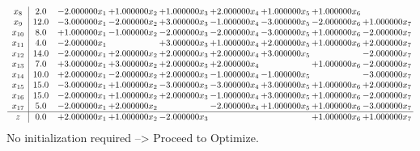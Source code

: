 \documentclass[10pt]{article}
\begin{document}
\[\begin{array}{c| c c@{\hskip 2pt} c@{\hskip 2pt} c@{\hskip 2pt} c@{\hskip 2pt} c@{\hskip 2pt} c@{\hskip 2pt} c@{\hskip 2pt} }
 x_{8}   &  2.0 & -2.000000 x_{1} & + 1.000000 x_{2} & + 1.000000 x_{3} & + 2.000000 x_{4} & + 1.000000 x_{5} & + 1.000000 x_{6} &   \\
 x_{9}   &  12.0 & -3.000000 x_{1} & -2.000000 x_{2} & + 3.000000 x_{3} & -1.000000 x_{4} & -3.000000 x_{5} & -2.000000 x_{6} & + 1.000000 x_{7}\\
 x_{10}   &  8.0 & + 1.000000 x_{1} & -1.000000 x_{2} & -2.000000 x_{3} & -2.000000 x_{4} & -3.000000 x_{5} & + 1.000000 x_{6} & -2.000000 x_{7}\\
 x_{11}   &  4.0 & -2.000000 x_{1} &   & + 3.000000 x_{3} & + 1.000000 x_{4} & + 2.000000 x_{5} & + 1.000000 x_{6} & + 2.000000 x_{7}\\
 x_{12}   &  14.0 & -2.000000 x_{1} & + 2.000000 x_{2} & + 2.000000 x_{3} & + 2.000000 x_{4} & + 3.000000 x_{5} &   & -2.000000 x_{7}\\
 x_{13}   &  7.0 & + 3.000000 x_{1} & + 3.000000 x_{2} & + 2.000000 x_{3} & + 2.000000 x_{4} &   & + 1.000000 x_{6} & -2.000000 x_{7}\\
 x_{14}   &  10.0 & + 2.000000 x_{1} & -2.000000 x_{2} & + 2.000000 x_{3} & -1.000000 x_{4} & -1.000000 x_{5} &   & -3.000000 x_{7}\\
 x_{15}   &  15.0 & -3.000000 x_{1} & + 1.000000 x_{2} & -3.000000 x_{3} & -3.000000 x_{4} & + 3.000000 x_{5} & + 1.000000 x_{6} & + 2.000000 x_{7}\\
 x_{16}   &  15.0 & -2.000000 x_{1} & + 1.000000 x_{2} & + 2.000000 x_{3} & -1.000000 x_{4} & + 3.000000 x_{5} & + 1.000000 x_{6} & -2.000000 x_{7}\\
 x_{17}   &  5.0 & -2.000000 x_{1} & + 2.000000 x_{2} &   & -2.000000 x_{4} & + 1.000000 x_{5} & + 1.000000 x_{6} & -3.000000 x_{7}\\
\hline
z    &  0.0 & + 2.000000 x_{1} & + 1.000000 x_{2} & -2.000000 x_{3} &    &   & + 1.000000 x_{6} & + 1.000000 x_{7}\\
\end{array}\]
No initialization required --> Proceed to Optimize. 
\end{document}
